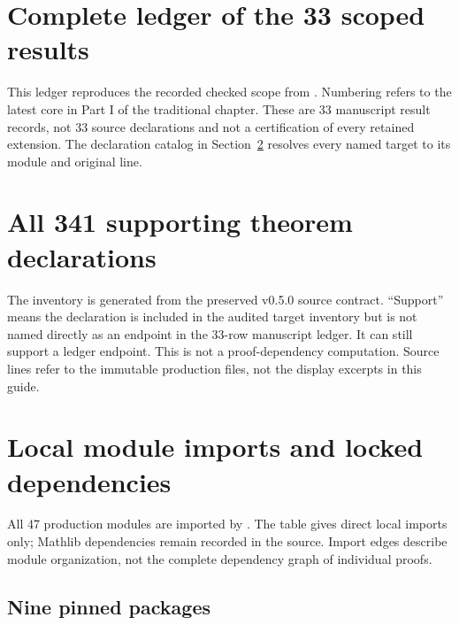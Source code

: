 \section{Complete ledger of the 33 scoped results}
\label{sec:ledger}
This ledger reproduces the recorded checked scope from . Numbering refers to the latest core in Part I of the traditional chapter. These are 33 manuscript result records, not 33 source declarations and not a certification of every retained extension. The declaration catalog in Section~\ref{sec:catalog} resolves every named target to its module and original line.

\clearpage
\section{All 341 supporting theorem declarations}
\label{sec:catalog}
The inventory is generated from the preserved v0.5.0 source contract. ``Support'' means the declaration is included in the audited target inventory but is not named directly as an endpoint in the 33-row manuscript ledger. It can still support a ledger endpoint. This is not a proof-dependency computation. Source lines refer to the immutable production files, not the display excerpts in this guide.

\clearpage
\section{Local module imports and locked dependencies}
\label{sec:imports}
All 47 production modules are imported by . The table gives direct local imports only; Mathlib dependencies remain recorded in the source. Import edges describe module organization, not the complete dependency graph of individual proofs.

\subsection{Nine pinned packages}


